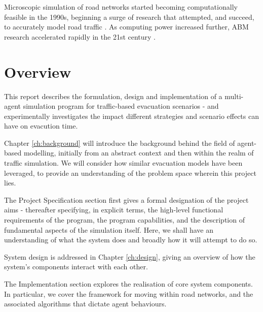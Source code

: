 Microscopic simulation of road networks started becoming computationally feasible in the 1990s, beginning a surge of research that attempted, and succeed, to accurately model road traffic \cite{Nagel1992ATraffic}. As computing power increased further, ABM research accelerated rapidly in the 21st century \cite{Bonabeau2002Agent-basedSystems.,Teodorovic2003TransportApproach}.

\section{Overview}
This report describes the formulation, design and implementation of a multi-agent simulation program for traffic-based evacuation scenarios - and experimentally investigates the impact different strategies and scenario effects can have on evacution time.

Chapter \ref{ch:background} will introduce the background behind the field of agent-based modelling, initially from an abstract context and then within the realm of traffic simulation. We will consider how similar evacuation models have been leveraged, to provide an understanding of the problem space wherein this project lies.

The Project Specification section first gives a formal designation of the project aims - thereafter specifying, in explicit terms, the high-level functional requirements of the program, the program capabilities, and the description of fundamental aspects of the simulation itself. Here, we shall have an understanding of what the system does and broadly how it will attempt to do so. 

System design is addressed in Chapter \ref{ch:design}, giving an overview of how the system's components interact with each other.

The Implementation section explores the realisation of core system components. In particular, we cover the framework for moving within road networks, and the associated algorithms that dictate agent behaviours.
